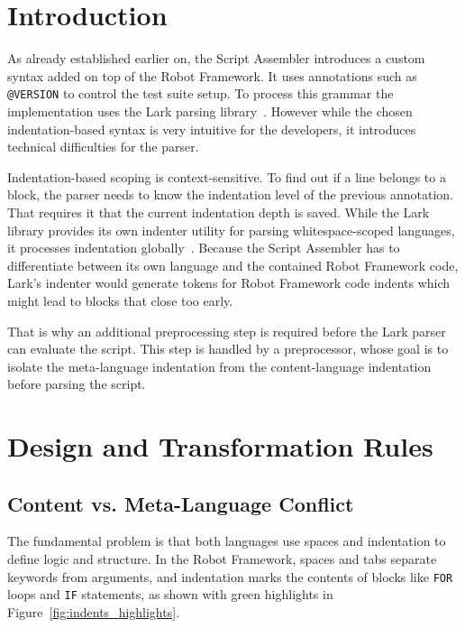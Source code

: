 
\section{Introduction}

    As already established earlier on, the Script Assembler introduces a custom syntax added on top of the Robot Framework. It uses annotations such as \texttt{@VERSION} to control the test suite setup. To process this grammar the implementation uses the Lark parsing library~\cite{LarkGithub}. However while the chosen indentation-based syntax is very intuitive for the developers, it introduces technical difficulties for the parser.

Indentation-based scoping is context-sensitive. To find out if a line belongs to a block, the parser needs to know the indentation level of the previous annotation. That requires it that the current indentation depth is saved. While the Lark library provides its own indenter utility for parsing whitespace-scoped languages, it processes indentation globally~\cite{LarkDocsIndent}.
Because the Script Assembler has to differentiate between its own language and the contained Robot Framework code, Lark's indenter would generate tokens for Robot Framework code indents which might lead to blocks that close too early.


That is why an additional preprocessing step is required before the Lark parser can evaluate the script. This step is handled by a preprocessor, whose goal is to isolate the meta-language indentation from the content-language indentation before parsing the script.


\section{Design and Transformation Rules}

\subsection{Content vs. Meta-Language Conflict}

The fundamental problem is that both languages use spaces and indentation to define logic and structure. In the Robot Framework, spaces and tabs separate keywords from arguments, and indentation marks the contents of blocks like \texttt{FOR} loops and \texttt{IF} statements, as shown with green highlights in Figure~\ref{fig:indents_highlights}.


